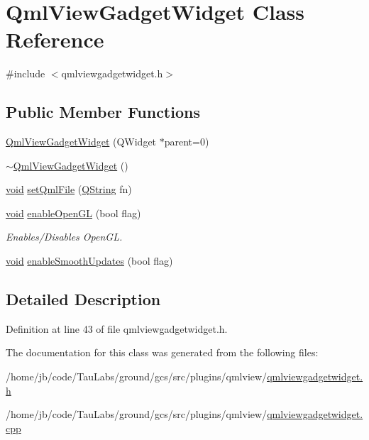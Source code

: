 \hypertarget{class_qml_view_gadget_widget}{\section{\-Qml\-View\-Gadget\-Widget \-Class \-Reference}
\label{class_qml_view_gadget_widget}
}


{\ttfamily \#include $<$qmlviewgadgetwidget.\-h$>$}

\subsection*{\-Public \-Member \-Functions}
\begin{DoxyCompactItemize}
\item 
\hyperlink{group___o_p_map_plugin_ga5f276e99396b6fdc55b2809358cdc036}{\-Qml\-View\-Gadget\-Widget} (\-Q\-Widget $\ast$parent=0)
\item 
\hyperlink{group___o_p_map_plugin_gab474fe9554896c3815e74bd3979a54a9}{$\sim$\-Qml\-View\-Gadget\-Widget} ()
\item 
\hyperlink{group___u_a_v_objects_plugin_ga444cf2ff3f0ecbe028adce838d373f5c}{void} \hyperlink{group___o_p_map_plugin_gadd4680d8e3dc82c1a2fc6812c609535d}{set\-Qml\-File} (\hyperlink{group___u_a_v_objects_plugin_gab9d252f49c333c94a72f97ce3105a32d}{\-Q\-String} fn)
\item 
\hyperlink{group___u_a_v_objects_plugin_ga444cf2ff3f0ecbe028adce838d373f5c}{void} \hyperlink{group___o_p_map_plugin_gae8d1d0bb3f42b7107492b4e146544e5d}{enable\-Open\-G\-L} (bool flag)
\begin{DoxyCompactList}\small\item\em \-Enables/\-Disables \-Open\-G\-L. \end{DoxyCompactList}\item 
\hyperlink{group___u_a_v_objects_plugin_ga444cf2ff3f0ecbe028adce838d373f5c}{void} \hyperlink{group___o_p_map_plugin_ga6c243c31f5bf4653f0bbd7b10527beb3}{enable\-Smooth\-Updates} (bool flag)
\end{DoxyCompactItemize}


\subsection{\-Detailed \-Description}


\-Definition at line 43 of file qmlviewgadgetwidget.\-h.



\-The documentation for this class was generated from the following files\-:\begin{DoxyCompactItemize}
\item 
/home/jb/code/\-Tau\-Labs/ground/gcs/src/plugins/qmlview/\hyperlink{qmlviewgadgetwidget_8h}{qmlviewgadgetwidget.\-h}\item 
/home/jb/code/\-Tau\-Labs/ground/gcs/src/plugins/qmlview/\hyperlink{qmlviewgadgetwidget_8cpp}{qmlviewgadgetwidget.\-cpp}\end{DoxyCompactItemize}

